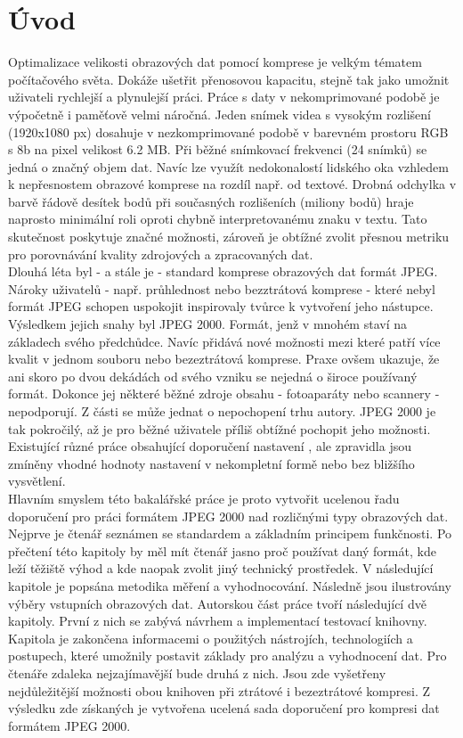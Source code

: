\chapter{Úvod}

Optimalizace velikosti obrazových dat pomocí komprese je velkým tématem počítačového světa. Dokáže ušetřit přenosovou kapacitu, stejně tak jako umožnit uživateli rychlejší a plynulejší práci. Práce s daty v nekomprimované podobě je výpočetně i paměťově velmi náročná. Jeden snímek videa s vysokým rozlišení (1920x1080 px) dosahuje v nezkomprimované podobě v barevném prostoru RGB s 8b na pixel velikost 6.2 MB. Při běžné snímkovací frekvenci (24 snímků) se jedná o značný objem dat. Navíc lze využít nedokonalostí lidského oka vzhledem k nepřesnostem obrazové komprese na rozdíl např. od textové. Drobná odchylka v barvě řádově desítek bodů při současných rozlišeních (miliony bodů) hraje naprosto minimální roli oproti chybně interpretovanému znaku v textu. Tato skutečnost poskytuje značné možnosti, zároveň je obtížné zvolit přesnou metriku pro porovnávání kvality zdrojových a zpracovaných dat.\\
Dlouhá léta byl - a stále je - standard komprese obrazových dat formát JPEG. Nároky uživatelů - např. průhlednost nebo bezztrátová komprese - které nebyl formát JPEG schopen uspokojit inspirovaly tvůrce k vytvoření jeho nástupce. 
Výsledkem jejich snahy byl JPEG 2000. Formát, jenž v mnohém staví na základech svého předchůdce. Navíc přidává nové možnosti mezi které patří více kvalit v jednom souboru nebo bezeztrátová komprese. Praxe ovšem ukazuje, že ani skoro po dvou dekádách od svého vzniku se nejedná o široce používaný formát. Dokonce jej některé běžné zdroje obsahu - fotoaparáty nebo scannery - nepodporují. Z části se může jednat o nepochopení trhu autory. JPEG 2000 je tak pokročilý, až je pro běžné uživatele příliš obtížné pochopit jeho možnosti. Existující různé práce obsahující doporučení nastavení \cite{profile} \cite{ndk} \cite{bl}, ale zpravidla jsou zmíněny vhodné hodnoty nastavení v nekompletní formě nebo bez bližšího vysvětlení. \\
Hlavním smyslem této bakalářské práce je proto vytvořit ucelenou řadu doporučení pro práci formátem JPEG 2000 nad rozličnými typy obrazových dat. Nejprve je čtenář seznámen se standardem a základním principem funkčnosti. 
Po přečtení této kapitoly by měl mít čtenář jasno proč používat daný formát, kde leží těžiště výhod a kde naopak zvolit jiný technický prostředek. V následující kapitole je popsána metodika měření a vyhodnocování. Následně jsou ilustrovány výběry vstupních obrazových dat. Autorskou část práce tvoří následující dvě kapitoly. První z nich se zabývá návrhem a implementací testovací knihovny. Kapitola je zakončena informacemi o použitých nástrojích, technologiích a postupech, které umožnily postavit základy pro analýzu a vyhodnocení dat. Pro čtenáře zdaleka nejzajímavější bude druhá z nich. Jsou zde vyšetřeny nejdůležitější možnosti obou knihoven při ztrátové i bezeztrátové kompresi. Z výsledku zde získaných je vytvořena ucelená sada doporučení pro kompresi dat formátem JPEG 2000. 

